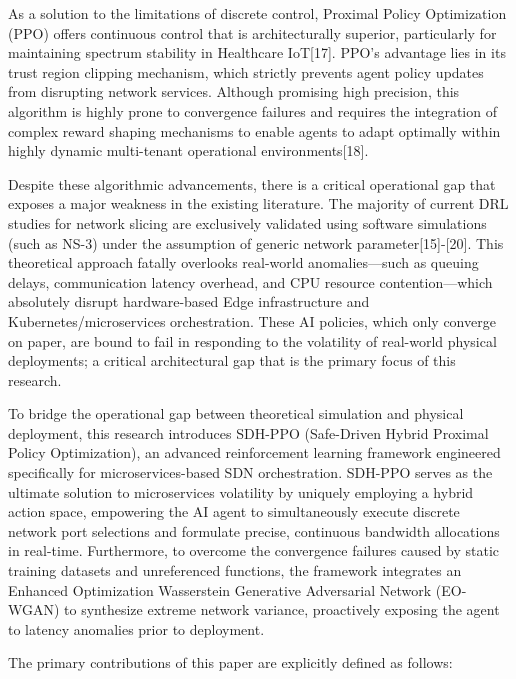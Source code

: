 As a solution to the limitations of discrete control, Proximal Policy Optimization (PPO) offers continuous control that is architecturally superior, particularly for maintaining spectrum stability in Healthcare IoT{[}17{]}. PPO's advantage lies in its trust region clipping mechanism, which strictly prevents agent policy updates from disrupting network services. Although promising high precision, this algorithm is highly prone to convergence failures and requires the integration of complex reward shaping mechanisms to enable agents to adapt optimally within highly dynamic multi-tenant operational environments{[}18{]}.

Despite these algorithmic advancements, there is a critical operational gap that exposes a major weakness in the existing literature. The majority of current DRL studies for network slicing are exclusively validated using software simulations (such as NS-3) under the assumption of generic network parameter{[}15{]}-{[}20{]}. This theoretical approach fatally overlooks real-world anomalies---such as queuing delays, communication latency overhead, and CPU resource contention---which absolutely disrupt hardware-based Edge infrastructure and Kubernetes/microservices orchestration. These AI policies, which only converge on paper, are bound to fail in responding to the volatility of real-world physical deployments; a critical architectural gap that is the primary focus of this research.

To bridge the operational gap between theoretical simulation and physical deployment, this research introduces SDH-PPO (Safe-Driven Hybrid Proximal Policy Optimization), an advanced reinforcement learning framework engineered specifically for microservices-based SDN orchestration. SDH-PPO serves as the ultimate solution to microservices volatility by uniquely employing a hybrid action space, empowering the AI agent to simultaneously execute discrete network port selections and formulate precise, continuous bandwidth allocations in real-time. Furthermore, to overcome the convergence failures caused by static training datasets and unreferenced functions, the framework integrates an Enhanced Optimization Wasserstein Generative Adversarial Network (EO-WGAN) to synthesize extreme network variance, proactively exposing the agent to latency anomalies prior to deployment.

The primary contributions of this paper are explicitly defined as follows:


